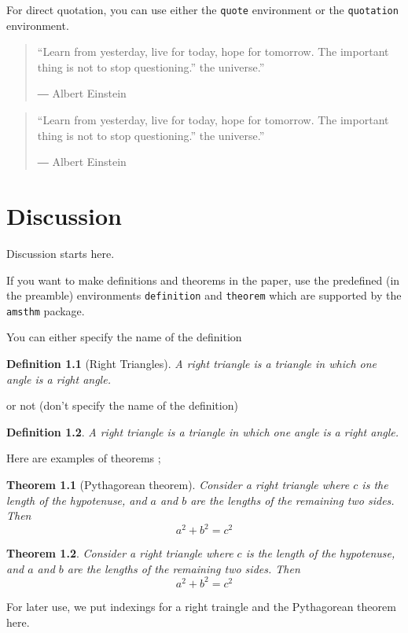 \documentclass{report}
\newtheorem{theorem}{Theorem} %
\newtheorem{definition}{Definition} %
\begin{document}
For direct quotation, you can use either the \texttt{quote} environment or the \texttt{quotation} environment.
\begin{quote}
“Learn from yesterday, live for today, hope for tomorrow. The important thing is not to stop questioning.” the universe.” \par
― Albert Einstein 
\end{quote}

\begin{quotation}
“Learn from yesterday, live for today, hope for tomorrow. The important thing is not to stop questioning.” the universe.” \par
― Albert Einstein 
\end{quotation}
\chapter{Discussion}\label{chap:discussion}
Discussion starts here.

If you want to make definitions and theorems in the paper, use the predefined (in the preamble) environments \texttt{definition} and \texttt{theorem} which are supported by the \texttt{amsthm} package.

You can either specify the name of the definition
\begin{definition}[Right Triangles]
A right triangle is a triangle in which one angle is a right angle.
\end{definition}
or not (don't specify the name of the definition)
\begin{definition}
A right triangle is a triangle in which one angle is a right angle.
\end{definition}

Here are examples of theorems ;
\begin{theorem}[Pythagorean theorem]
Consider a right triangle where \(c\) is the length of the hypotenuse, and \(a\) and \(b\) are the lengths of the remaining two sides.
Then
\begin{equation}
a^2+b^2=c^2
\end{equation}
\end{theorem}

\begin{theorem}
Consider a right triangle where \(c\) is the length of the hypotenuse, and \(a\) and \(b\) are the lengths of the remaining two sides.
Then
\begin{equation}
a^2+b^2=c^2
\end{equation}
\end{theorem}
For later use, we put indexings for a right traingle and the Pythagorean theorem here.
\end{document}
